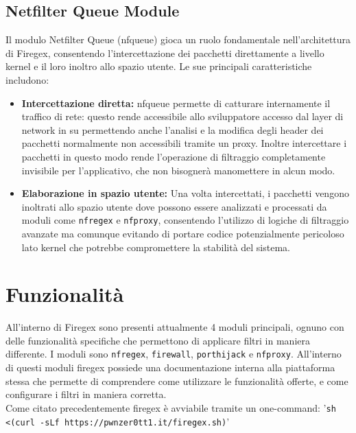 \subsection{Netfilter Queue Module}
Il modulo Netfilter Queue (nfqueue) gioca un ruolo fondamentale nell'architettura di Firegex, consentendo l'intercettazione dei pacchetti direttamente
a livello kernel e il loro inoltro allo spazio utente. Le sue principali caratteristiche includono:
\begin{itemize}
    \item \textbf{Intercettazione diretta:} nfqueue permette di catturare internamente il traffico di rete: questo rende accessibile allo sviluppatore accesso dal layer di network in su
    permettendo anche l'analisi e la modifica degli header dei pacchetti normalmente non accessibili tramite un proxy. Inoltre intercettare i pacchetti in questo modo rende l'operazione di filtraggio completamente
    invisibile per l'applicativo, che non bisognerà manomettere in alcun modo.
    \item \textbf{Elaborazione in spazio utente:} Una volta intercettati, i pacchetti vengono inoltrati allo spazio utente dove possono essere analizzati e
    processati da moduli come \texttt{nfregex} e \texttt{nfproxy}, consentendo l'utilizzo di logiche di filtraggio avanzate ma comunque evitando di portare codice potenzialmente pericoloso
    lato kernel che potrebbe compromettere la stabilità del sistema.
\end{itemize}

\section{Funzionalità}

All'interno di Firegex sono presenti attualmente 4 moduli principali, ognuno con delle funzionalità specifiche che permettono di applicare filtri in maniera
differente. I moduli sono \texttt{nfregex}, \texttt{firewall}, \texttt{porthijack} e \texttt{nfproxy}. All'interno di questi moduli firegex possiede una documentazione
interna alla piattaforma stessa che permette di comprendere come utilizzare le funzionalità offerte, e come configurare i filtri in maniera corretta.\\
Come citato precedentemente firegex è avviabile tramite un one-command: '\texttt{sh <(curl -sLf https://pwnzer0tt1.it/firegex.sh)}'

